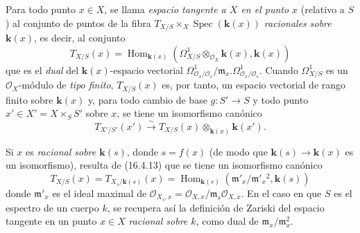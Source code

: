 \begin{env}[16.5.13]
\label{IV.16.5.13}
Para todo punto $x\in X$, se llama \emph{espacio tangente a $X$ en el punto $x$}
(relativo a $S$) al conjunto de puntos de la fibra
$T_{X/S}\times_X\operatorname{Spec}(\boldsymbol k(x))$ \emph{racionales sobre $\boldsymbol k(x)$}, es decir,
al conjunto
\[
  T_{X/S}(x)=
  \operatorname{Hom}_{\mathbf k(x)}
  (\varOmega_{X/S}^1\otimes_{\mathcal O_X}\boldsymbol k(x),\boldsymbol k(x))
  \tag{16.5.13.1}
  \label{IV.16.5.13.1}
\]
que es el \emph{dual} del $\boldsymbol k(x)$-espacio vectorial
$\Omega_{\mathcal{O}_x/\mathcal{O}_s}^1/
\mathfrak{m}_x.\Omega_{\mathcal{O}_x/\mathcal{O}_s}^1$. Cuando
$\varOmega_{X/S}^1$ es un $\mathcal{O}_X$-módulo de \emph{tipo finito},
$T_{X/S}(x)$ es, por tanto, un espacio vectorial de rango finito sobre $\boldsymbol k(x)$ y, para
todo
cambio de base $g:S'\to S$ y todo punto
$x'\in X'=X\times_S S'$ sobre $x$, se tiene un isomorfismo canónico
\[
  T_{X'/S'}(x')\xrightarrow{\sim}
  T_{X/S}(x)\otimes_{\mathbf k(x)}\boldsymbol k(x').
  \tag{16.5.13.2}
  \label{IV.16.5.13.2}
\]

Si $x$ es \emph{racional sobre $\boldsymbol k(s)$}, donde $s=f(x)$ (de modo que
$\boldsymbol k(s)\to\boldsymbol k(x)$ es un isomorfismo), resulta de (16.4.13) que se tiene un
isomorfismo canónico
\[
  T_{X/S}(x)=T_{X_s/\mathbf k(s)}(x)
  =\operatorname{Hom}_{\mathbf k(s)}
  (\mathfrak{m}'_x/\mathfrak{m}'_x{}^2,\boldsymbol k(s))
  \tag{16.5.13.3}
  \label{IV.16.5.13.3}
\]
donde $\mathfrak{m}'_x$ es el ideal maximal de
$\mathcal{O}_{X_s,x}=\mathcal{O}_{X,x}/
\mathfrak{m}_s\mathcal{O}_{X,x}$. En el caso en que $S$ es el espectro de un cuerpo
$k$, se recupera así la definición de Zariski del espacio tangente en un
punto $x\in X$ \emph{racional sobre $k$}, como dual de
$\mathfrak{m}_x/\mathfrak{m}_x^2$.


\end{env}
